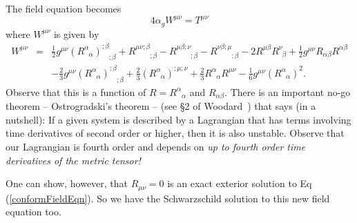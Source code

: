 The field equation becomes
\begin{equation}\label{conformFieldEqn}
4\alpha_{g}W^{\mu\nu} = T^{\mu\nu}
\end{equation}
where $W^{\mu\nu}$ is given by
\begin{eqnarray}
W^{\mu \nu}&= &
\frac{1}{2}g^{\mu\nu}(R^{\alpha}_{\phantom{\alpha}\alpha})   
^{;\beta}_{\phantom{;\beta};\beta}+
R^{\mu\nu;\beta}_{\phantom{\mu\nu;\beta};\beta}                     
 -R^{\mu\beta;\nu}_{\phantom{\mu\beta;\nu};\beta}                        
-R^{\nu \beta;\mu}_{\phantom{\nu \beta;\mu};\beta}                          
 - 2R^{\mu\beta}R^{\nu}_{\phantom{\nu}\beta}                                    
+\frac{1}{2}g^{\mu\nu}R_{\alpha\beta}R^{\alpha\beta}
\nonumber \\
&&-\frac{2}{3}g^{\mu\nu}(R^{\alpha}_{\phantom{\alpha}\alpha})          
^{;\beta}_{\phantom{;\beta};\beta}                                              
+\frac{2}{3}(R^{\alpha}_{\phantom{\alpha}\alpha})^{;\mu;\nu}                           
+\frac{2}{3} R^{\alpha}_{\phantom{\alpha}\alpha}
R^{\mu\nu}                              
-\frac{1}{6}g^{\mu\nu}(R^{\alpha}_{\phantom{\alpha}\alpha})^2.
\label{3}
\end{eqnarray}    
Observe that this is a function of $R={R^{\alpha}}_{\alpha}$ and
$R_{\alpha\beta}$. There is an important no-go theorem --
Ostrogradski's theorem -- (see \S 2 of
Woodard~\cite{Woodard:2006nt}) that says (in a nutshell): If a given system
is described by a Lagrangian that has terms involving time derivatives of
second order or higher, then it is also unstable. Observe that our
Lagrangian is fourth order and depends on \emph{up to fourth order
  time derivatives of the metric tensor!} 

One can show, however, that $R_{\mu\nu} = 0$ is an exact exterior
solution to Eq (\ref{conformFieldEqn}). So we have the Schwarzschild
solution to this new field equation too.
